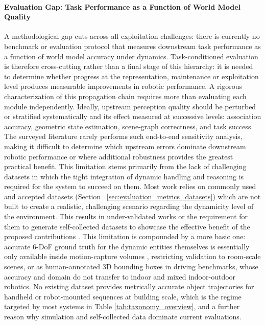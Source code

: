 \paragraph{Evaluation Gap: Task Performance as a Function of World Model Quality}\label{sec:open_challenges_metrics_gap}
A methodological gap cuts across all exploitation challenges: there is currently no benchmark or evaluation protocol that measures downstream task performance as a function of world model accuracy under dynamics.
Task-conditioned evaluation is therefore cross-cutting rather than a final stage of this hierarchy: it is needed to determine whether progress at the representation, maintenance or exploitation level produces measurable improvements in robotic performance. 
A rigorous characterization of this propagation chain requires more than evaluating each module independently. 
Ideally, upstream perception quality should be perturbed or stratified systematically and its effect measured at successive levels: association accuracy, geometric state estimation, scene-graph correctness, and task success.
The surveyed literature rarely performs such end-to-end sensitivity analysis, making it difficult to determine which upstream errors dominate downstream robotic performance or where additional robustness provides the greatest practical benefit.
This limitation stems primarily from the lack of challenging datasets in which the tight integration of dynamic handling and reasoning is required for the system to succeed on them.
Most work relies on commonly used and accepted datasets (Section ~\ref{sec:evaluation_metrics_datasets}) which are not built to create a realistic, challenging scenario regarding the dynamicity level of the environment. 
This results in under-validated works or the requirement for them to generate self-collected datasets to showcase the effective benefit of the proposed contributions \cite{giberna_dynemo-slam_2025}.
This limitation is compounded by a more basic one: accurate 6-DoF ground truth for the dynamic entities themselves is essentially only available inside motion-capture volumes \cite{sturm_benchmark_2012}\cite{palazzolo2019iros}\cite{judd_oxford_2019}, restricting validation to room-scale scenes, or as human-annotated 3D bounding boxes in driving benchmarks\cite{geiger_are_2012}\cite{caesar_nuscenes_2019}, whose accuracy and domain do not transfer to indoor and mixed indoor-outdoor robotics. 
No existing dataset provides metrically accurate object trajectories for handheld or robot-mounted sequences at building scale, which is the regime targeted by most systems in Table \ref{tab:taxonomy_overview}, and a further reason why simulation\cite{rosinol_kimera_2021}\cite{tartanair2020iros} and self-collected data \cite{giberna_dynemo-slam_2025} dominate current evaluations.

